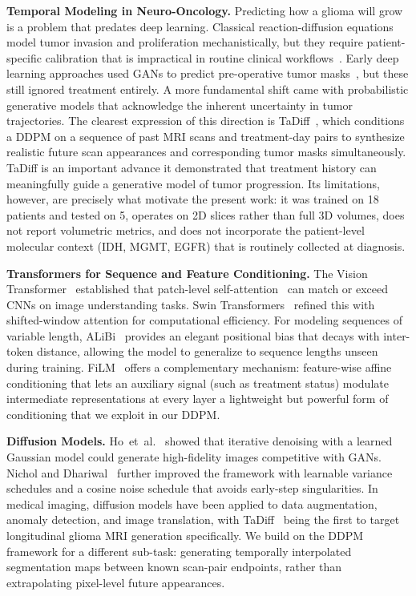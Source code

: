 \documentclass[conference]{IEEEtran}
\begin{document}
\textbf{Temporal Modeling in Neuro-Oncology.}
Predicting how a glioma will grow is a problem that predates deep learning. Classical reaction-diffusion equations model tumor invasion and proliferation mechanistically, but they require patient-specific calibration that is impractical in routine clinical workflows~\cite{liu2023tadiff}. Early deep learning approaches used GANs to predict pre-operative tumor masks~\cite{liu2023tadiff}, but these still ignored treatment entirely. A more fundamental shift came with probabilistic generative models that acknowledge the inherent uncertainty in tumor trajectories. The clearest expression of this direction is TaDiff~\cite{liu2023tadiff}, which conditions a DDPM on a sequence of past MRI scans and treatment-day pairs to synthesize realistic future scan appearances and corresponding tumor masks simultaneously. TaDiff is an important advance \textemdash{} it demonstrated that treatment history can meaningfully guide a generative model of tumor progression. Its limitations, however, are precisely what motivate the present work: it was trained on 18 patients and tested on 5, operates on 2D slices rather than full 3D volumes, does not report volumetric metrics, and does not incorporate the patient-level molecular context (IDH, MGMT, EGFR) that is routinely collected at diagnosis.

\textbf{Transformers for Sequence and Feature Conditioning.}
The Vision Transformer~\cite{dosovitskiy2021vit} established that patch-level self-attention~\cite{vaswani2017attention} can match or exceed CNNs on image understanding tasks. Swin Transformers~\cite{liu2021swin} refined this with shifted-window attention for computational efficiency. For modeling sequences of variable length, ALiBi~\cite{press2022alibi} provides an elegant positional bias that decays with inter-token distance, allowing the model to generalize to sequence lengths unseen during training. FiLM~\cite{perez2018film} offers a complementary mechanism: feature-wise affine conditioning that lets an auxiliary signal (such as treatment status) modulate intermediate representations at every layer \textemdash{} a lightweight but powerful form of conditioning that we exploit in our DDPM.

\textbf{Diffusion Models.}
Ho~et~al.~\cite{ho2020ddpm} showed that iterative denoising with a learned Gaussian model could generate high-fidelity images competitive with GANs. Nichol and Dhariwal~\cite{nichol2021improved} further improved the framework with learnable variance schedules and a cosine noise schedule that avoids early-step singularities. In medical imaging, diffusion models have been applied to data augmentation, anomaly detection, and image translation, with TaDiff~\cite{liu2023tadiff} being the first to target longitudinal glioma MRI generation specifically. We build on the DDPM framework for a different sub-task: generating temporally interpolated segmentation maps between known scan-pair endpoints, rather than extrapolating pixel-level future appearances.
\end{document}
